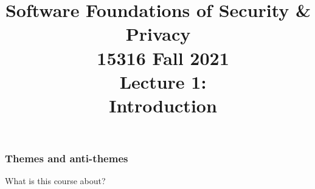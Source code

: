 \documentclass[10pt]{beamer}
\title[Software Foundations of S \& P]{
\RaggedRight
	Software Foundations of Security \& Privacy \\
	\ 15316 Fall 2021 \\
	\ Lecture 1: \\
	\ Introduction
}
\author[Matt Fredrikson]{
\texorpdfstring{%
    \begin{columns}
      \column{.3333\linewidth}
      \centering
      Matt Fredrikson \\ \emph{Instructor} \\ \texttt{mfredrik}
      \column{.3333\linewidth}
      \centering
      Jiaqi Liu \\ \emph{TA} \\ \texttt{jiaqiliu}
      \column{.3333\linewidth}
      \centering
      Victor Song \\ \emph{TA} \\ \texttt{yiwenson}
    \end{columns}
 }
 {Author 1, Author 2, Author 3}
}
\begin{document}
\setlength\abovedisplayskip{5pt}
\setlength\belowdisplayskip{5pt}


\begin{frame}
\titlepage
\end{frame}














\begin{frame}

\frametitle{Themes and anti-themes}

What is this course about?
\\[2em]

\end{frame}

\end{document}
